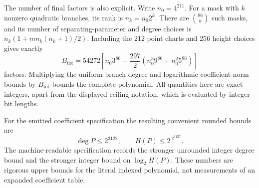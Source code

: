 The number of final factors is also explicit. Write $n_0=4^{211}$.
For a mask with $k$ nonzero quadratic branches, its rank is
$n_k=n_0 2^k$. There are $\binom{86}{k}$ such masks, and its number
of separating-parameter and degree choices is
$n_k(1+m n_k(n_k+1)/2)$. Including the $212$ point charts and $256$
height choices gives exactly
\[
 B_{\mathrm{tot}}=54272\left[
 n_0 3^{86}+
 \frac{297}{2}\left(n_0^3 9^{86}+n_0^2 5^{86}\right)\right]
\]
factors. Multiplying the uniform branch degree and logarithmic
coefficient-norm bounds by $B_{\mathrm{tot}}$ bounds the complete
polynomial. All quantities here are exact integers, apart from the
displayed ceiling notation, which is evaluated by integer bit lengths.

For the emitted coefficient specification the resulting convenient
rounded bounds are
\[
 \deg P\le2^{3122},\qquad H(P)\le2^{\,2^{3127}}.
\]
The machine-readable specification records the stronger unrounded
integer degree bound and the stronger integer bound on $\log_2 H(P)$.
These numbers are rigorous upper bounds for the literal indexed
polynomial, not measurements of an expanded coefficient table.
